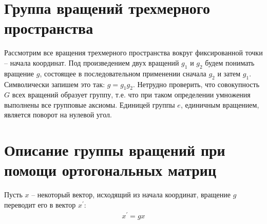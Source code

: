 \documentclass[14pt]{extarticle}
\newcommand{\pr}{\prime}
\begin{document}
\section*{Группа вращений трехмерного пространства}

Рассмотрим все вращения трехмерного пространства вокруг фиксированной точки -- начала координат. Под произведением двух вращений $g_1$ и $g_2$ будем понимать вращение $g$, состоящее в последовательном применении сначала $g_2$ и затем $g_1$. Символически запишем это так: $g = g_1 g_2$. Нетрудно проверить, что совокупность $G$ всех вращений образует группу, т.е. что при таком определении умножения выполнены все групповые аксиомы. Единицей группы $e$, единичным вращением, является поворот на нулевой угол. \par

\section*{Описание группы вращений при помощи ортогональных матриц}

Пусть $x$ -- некоторый вектор, исходящий из начала координат, вращение $g$ переводит его в вектор $x^\pr$:
\begin{gather}
		x^\pr = g x \label{rotation_action}
\end{gather}
\end{document}
